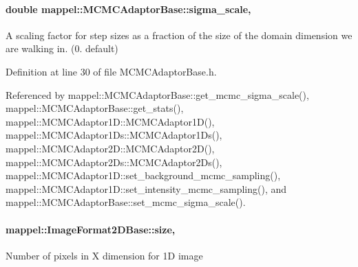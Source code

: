 \paragraph[{\texorpdfstring{sigma\+\_\+scale}{sigma_scale}}]{\setlength{\rightskip}{0pt plus 5cm}double mappel\+::\+M\+C\+M\+C\+Adaptor\+Base\+::sigma\+\_\+scale\hspace{0.3cm}{\ttfamily [protected]}, {\ttfamily [inherited]}}\hypertarget{classmappel_1_1MCMCAdaptorBase_a76312f7d589bf3f3e754beca174b884b}{}\label{classmappel_1_1MCMCAdaptorBase_a76312f7d589bf3f3e754beca174b884b}
A scaling factor for step sizes as a fraction of the size of the domain dimension we are walking in. (0. default) 

Definition at line 30 of file M\+C\+M\+C\+Adaptor\+Base.\+h.



Referenced by mappel\+::\+M\+C\+M\+C\+Adaptor\+Base\+::get\+\_\+mcmc\+\_\+sigma\+\_\+scale(), mappel\+::\+M\+C\+M\+C\+Adaptor\+Base\+::get\+\_\+stats(), mappel\+::\+M\+C\+M\+C\+Adaptor1\+D\+::\+M\+C\+M\+C\+Adaptor1\+D(), mappel\+::\+M\+C\+M\+C\+Adaptor1\+Ds\+::\+M\+C\+M\+C\+Adaptor1\+Ds(), mappel\+::\+M\+C\+M\+C\+Adaptor2\+D\+::\+M\+C\+M\+C\+Adaptor2\+D(), mappel\+::\+M\+C\+M\+C\+Adaptor2\+Ds\+::\+M\+C\+M\+C\+Adaptor2\+Ds(), mappel\+::\+M\+C\+M\+C\+Adaptor1\+D\+::set\+\_\+background\+\_\+mcmc\+\_\+sampling(), mappel\+::\+M\+C\+M\+C\+Adaptor1\+D\+::set\+\_\+intensity\+\_\+mcmc\+\_\+sampling(), and mappel\+::\+M\+C\+M\+C\+Adaptor\+Base\+::set\+\_\+mcmc\+\_\+sigma\+\_\+scale().

\paragraph[{\texorpdfstring{size}{size}}]{ mappel\+::\+Image\+Format2\+D\+Base\+::size\hspace{0.3cm}{\ttfamily [protected]}, {\ttfamily [inherited]}}\hypertarget{classmappel_1_1ImageFormat2DBase_a3be77d2aa6ec9f3815322732950c2a60}{}\label{classmappel_1_1ImageFormat2DBase_a3be77d2aa6ec9f3815322732950c2a60}
Number of pixels in X dimension for 1D image 

